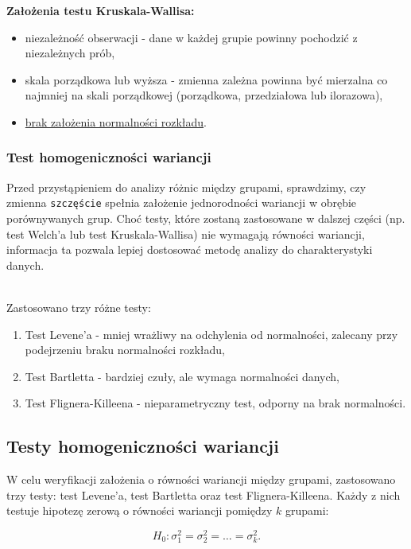 \documentclass[12pt,a4paper]{article}
\begin{document}
\textbf{Założenia testu Kruskala-Wallisa:}
\begin{itemize}
    \item niezależność obserwacji - dane w każdej grupie powinny pochodzić z niezależnych prób,
    \item skala porządkowa lub wyższa - zmienna zależna powinna być mierzalna co najmniej na skali porządkowej (porządkowa, przedziałowa lub ilorazowa),
    \item \underline{brak założenia normalności rozkładu}.
\end{itemize}


\vspace{10mm}

\subsubsection{Test homogeniczności wariancji}
Przed przystąpieniem do analizy różnic między grupami, sprawdzimy, czy zmienna \texttt{szczęście} spełnia założenie jednorodności wariancji w obrębie porównywanych grup. Choć testy, które zostaną zastosowane w dalszej części (np. test Welch’a lub test Kruskala-Wallisa) nie wymagają równości wariancji, informacja ta pozwala lepiej dostosować metodę analizy do charakterystyki danych.

\vspace{3mm}
\\Zastosowano trzy różne testy:
\begin{enumerate}
    \item Test Levene’a - mniej wrażliwy na odchylenia od normalności, zalecany przy podejrzeniu braku normalności rozkładu,
    \item Test Bartletta - bardziej czuły, ale wymaga normalności danych,
    \item Test Flignera-Killeena - nieparametryczny test, odporny na brak normalności.
\end{enumerate}
\newpage
\subsection*{Testy homogeniczności wariancji}

W celu weryfikacji założenia o równości wariancji między grupami, zastosowano trzy testy: test Levene’a, test Bartletta oraz test Flignera-Killeena. Każdy z nich testuje hipotezę zerową o równości wariancji pomiędzy $k$ grupami:

$$
H_0: \sigma_1^2 = \sigma_2^2 = \dots = \sigma_k^2.
$$
\vspace{10mm}
\end{document}
